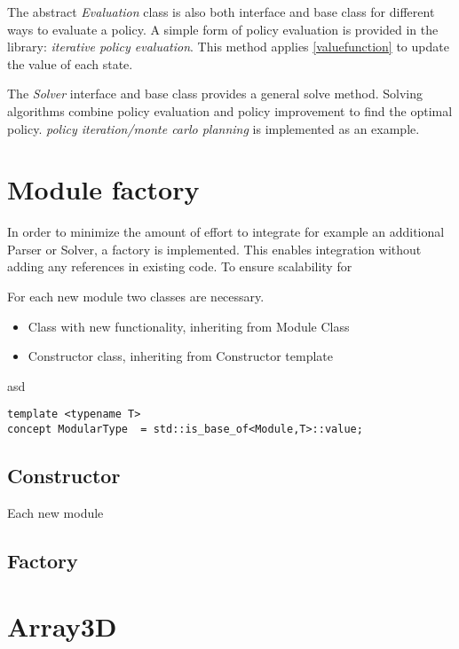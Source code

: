 The abstract \emph{Evaluation} class is also both interface and base class for different ways to evaluate a policy. A simple form of policy evaluation is provided in the library: \emph{iterative policy evaluation}. This method applies \autoref{valuefunction} to update the value of each state. 

The \emph{Solver} interface and base class provides a general solve method. Solving algorithms combine policy evaluation and policy improvement to find the optimal policy. \emph{policy iteration/monte carlo planning} is implemented as an example.

\section{Module factory}
\label{integration}

In order to minimize the amount of effort to integrate for example an additional Parser or Solver, a factory is implemented. This enables integration without adding any references in existing code. To ensure scalability for 

For each new module two classes are necessary.

\begin{itemize}
	\item Class with new functionality, inheriting from Module Class
	\item Constructor class, inheriting from Constructor template
\end{itemize}


asd
\begin{lstlisting}
template <typename T>
concept ModularType  = std::is_base_of<Module,T>::value;
\end{lstlisting}

\subsection{Constructor}
Each new module 


\subsection{Factory}


\section{Array3D}

